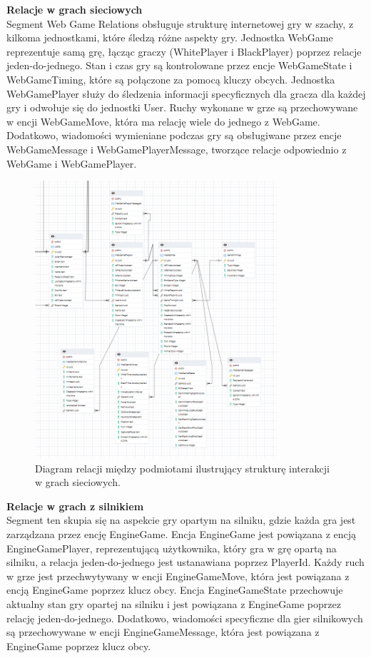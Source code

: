 \documentclass[12pt,a4paper]{article}
\begin{document}
\textbf{Relacje w grach sieciowych}\\
Segment Web Game Relations obsługuje strukturę internetowej gry w szachy, z kilkoma jednostkami, które śledzą różne aspekty gry. Jednostka WebGame reprezentuje samą grę, łącząc graczy (WhitePlayer i BlackPlayer) poprzez relacje jeden-do-jednego. Stan i czas gry są kontrolowane przez encje WebGameState i WebGameTiming, które są połączone za pomocą kluczy obcych. Jednostka WebGamePlayer służy do śledzenia informacji specyficznych dla gracza dla każdej gry i odwołuje się do jednostki User. Ruchy wykonane w grze są przechowywane w encji WebGameMove, która ma relację wiele do jednego z WebGame. Dodatkowo, wiadomości wymieniane podczas gry są obsługiwane przez encje WebGameMessage i WebGamePlayerMessage, tworzące relacje odpowiednio z WebGame i WebGamePlayer.

\begin{figure}[h!]
    \centering
    \includegraphics[width=0.8\textwidth]{zdj/online_ERD.png}
    \caption{Diagram relacji między podmiotami ilustrujący strukturę interakcji w grach sieciowych.}
    
\end{figure}
\newpage

\textbf{Relacje w grach z silnikiem}\\
Segment ten skupia się na aspekcie gry opartym na silniku, gdzie każda gra jest zarządzana przez encję EngineGame. Encja EngineGame jest powiązana z encją EngineGamePlayer, reprezentującą użytkownika, który gra w grę opartą na silniku, a relacja jeden-do-jednego jest ustanawiana poprzez PlayerId. Każdy ruch w grze jest przechwytywany w encji EngineGameMove, która jest powiązana z encją EngineGame poprzez klucz obcy. Encja EngineGameState przechowuje aktualny stan gry opartej na silniku i jest powiązana z EngineGame poprzez relację jeden-do-jednego. Dodatkowo, wiadomości specyficzne dla gier silnikowych są przechowywane w encji EngineGameMessage, która jest powiązana z EngineGame poprzez klucz obcy.
\end{document}

